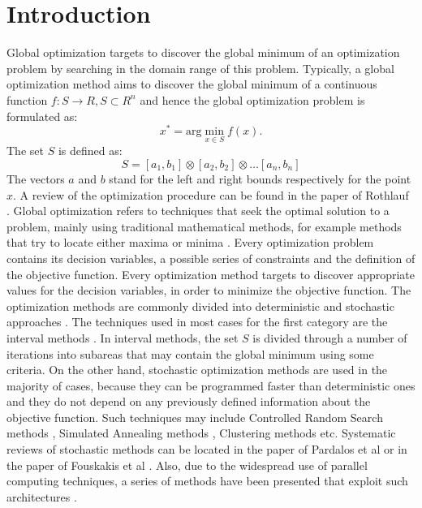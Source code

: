 \documentclass[journal,article,submit,pdftex,moreauthors]{Definitions/mdpi}
\begin{document}
\section{Introduction}
Global optimization targets to discover the global minimum of an optimization problem by searching in the domain range of this problem. Typically,  a global optimization method aims to discover the global minimum of  a continuous function $f:S\rightarrow R,S\subset R^{n}$\textbf{
} and hence the global optimization problem is formulated as:
\begin{equation}
x^{*}=\mbox{arg}\min_{x\in S}f(x).\label{eq:eq1}
\end{equation}
The set $S$ is defined as:\textbf{ 
\[
S=\left[a_{1},b_{1}\right]\otimes\left[a_{2},b_{2}\right]\otimes\ldots\left[a_{n},b_{n}\right]
\]
}
The vectors $a$ and $b$  stand for the left and right bounds respectively
for the point $x$.  A  review of the optimization procedure can be found in the paper of Rothlauf \cite{rothlauf2011optimization}. Global optimization refers to techniques that seek the optimal solution to a problem, mainly using traditional mathematical methods, for example methods that try to locate either maxima or minima \cite{horst2000introduction,weise2009global,ovelade2021ebola}. Every optimization problem contains its decision variables, a possible series of constraints and the definition of the objective function\cite{deb2016multi}.  Every optimization method targets to discover appropriate values for the decision variables, in order to minimize the objective function. The optimization methods are commonly  divided into deterministic and stochastic approaches \cite{liberti2005comparison}. The techniques used in most cases for the first category are the interval methods \cite{interval1, interval2}. In interval methods, the set $S$ is divided  through a number of iterations into  subareas that may contain the global minimum using some criteria. On the other hand, stochastic optimization methods are used in the majority of cases, because they can be programmed faster than deterministic ones
 and they do not depend on  any previously defined information about the objective function. Such techniques may include Controlled Random Search methods \cite{crs1,crs2, crs3}, Simulated Annealing methods \cite{siman1,siman2}, Clustering methods \cite{clustering1, clustering2, clustering3} etc.  Systematic reviews of stochastic methods can be located  in the paper of Pardalos et al \cite{pardalos2000recent} or in the paper of Fouskakis et al \cite{fouskakis2002stochastic}. Also, due to the widespread use of parallel computing techniques, a series of methods have been presented that exploit such architectures \cite{msgpu1, msgpu2}.
\end{document}
